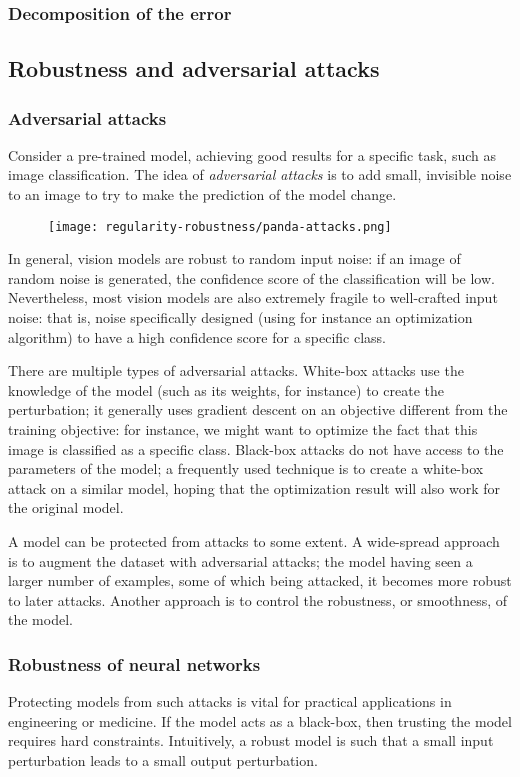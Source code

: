 \subsubsection{Decomposition of the error}


\subsection{Robustness and adversarial attacks}
\subsubsection{Adversarial attacks}
Consider a pre-trained model, achieving good results for a specific task, such as image classification. The idea of \emph{adversarial attacks} is to add small, invisible noise to an image to try to make the prediction of the model change.
\begin{figure}[H]
    \centering
    \texttt{[image: regularity-robustness/panda-attacks.png]}
\end{figure}
In general, vision models are robust to random input noise: if an image of random noise is generated, the confidence score of the classification will be low. Nevertheless, most vision models are also extremely fragile to well-crafted input noise: that is, noise specifically designed (using for instance an optimization algorithm) to have a high confidence score for a specific class.

There are multiple types of adversarial attacks. White-box attacks use the knowledge of the model (such as its weights, for instance) to create the perturbation; it generally uses gradient descent on an objective different from the training objective: for instance, we might want to optimize the fact that this image is classified as a specific class. Black-box attacks do not have access to the parameters of the model; a frequently used technique is to create a white-box attack on a similar model, hoping that the optimization result will also work for the original model.

A model can be protected from attacks to some extent. A wide-spread approach is to augment the dataset with adversarial attacks; the model having seen a larger number of examples, some of which being attacked, it becomes more robust to later attacks. Another approach is to control the robustness, or smoothness, of the model. 

\subsubsection{Robustness of neural networks}
Protecting models from such attacks is vital for practical applications in engineering or medicine. If the model acts as a black-box, then trusting the model requires hard constraints. Intuitively, a robust model is such that a small input perturbation leads to a small output perturbation.

